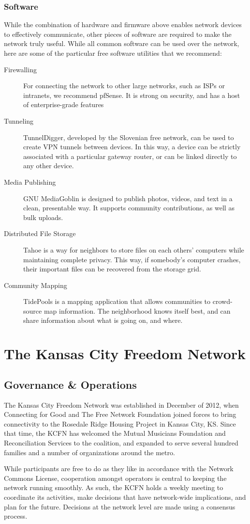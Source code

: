 \subsubsection{Software}
While the combination of hardware and firmware above enables network devices to
effectively communicate, other pieces of software are required to make the
network truly useful. While all common software can be used over the
network, here are some of the particular free software utilities that we recommend:
\begin{description}
\item[Firewalling] For connecting the network to other large networks, such as ISPs
or intranets, we recommend pfSense. It is strong on security, and has a host of
enterprise-grade features
\item[Tunneling] TunnelDigger, developed by the Slovenian free network, can be
used to create VPN tunnels between devices. In this way, a device can be
strictly associated with a particular gateway router, or can be linked directly
to any other device.
\item[Media Publishing] GNU MediaGoblin is designed to publish photos, videos, and
text in a clean, presentable way. It supports community contributions, as well as
bulk uploads.
\item[Distributed File Storage] Tahoe is a way for neighbors to store files on
 each others' computers while maintaining complete privacy. This way, if
somebody's computer crashes, their important files can be recovered from the
storage grid.
\item[Community Mapping] TidePools is a mapping application that allows
communities to crowd-source map information. The neighborhood knows itself best,
and can share information about what is going on, and where.
\end{description} 


\section{The Kansas City Freedom Network}\label{KCFN}
\subsection{Governance \& Operations}
The Kansas City Freedom Network was established in December of 2012, when
Connecting for Good and The Free Network Foundation joined forces to bring
connectivity to the Rosedale Ridge Housing Project in Kansas City, KS. Since
that time, the KCFN has welcomed the Mutual Musicians Foundation and
Reconciliation Services to the coalition, and expanded to serve several hundred 
families and a number of organizations around the metro. \par
While participants are free to do
as they like in accordance with the Network Commons License,
cooperation amongst operators is central to keeping the network running smoothly. As such, the 
KCFN holds a weekly meeting to coordinate its activities, make decisions
that have network-wide implications, and plan for the future. Decisions at the
network level are made using a consensus process. \par 

